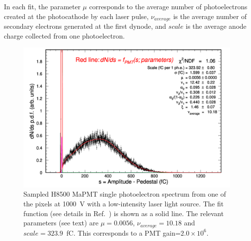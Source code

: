 \documentclass[5p,times,twocolumn]{elsarticle}
\def\MaPMT{MaPMT }
\begin{document}
In each fit, the parameter $\mu$ corresponds to the average number of photoelectrons created at the photocathode by
each laser pulse, $\nu_{average}$ is the average number of secondary electrons generated at the first dynode, and $scale$ is the 
average anode charge collected from one photoelectron. 
 
\begin{figure}[bth]
	\centering
	\includegraphics[width=\linewidth]{H8500-r-W0-CA7709-w3-g064-v1000-t227-37.pdf}
	\caption{Sampled H8500 \MaPMT single photoelectron spectrum from one of the pixels at 1000~V with a low-intensity
          laser light source. The fit function (see details in Ref.~\cite{Pavel}) is shown as a solid line. 
          The relevant parameters (see text) are $\mu=0.0056$, $\nu_{average}=10.18$ and $scale=323.9$~fC. This corresponds
          to a PMT gain=$2.0 \times 10^6$.
          }
	\label{fig:SPEH8500}
\end{figure}
\end{document}
